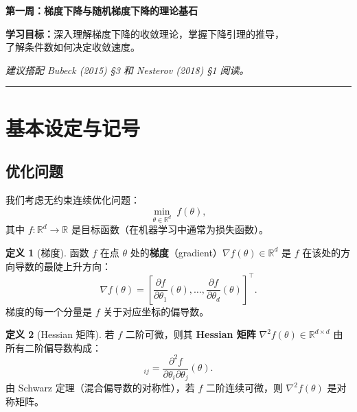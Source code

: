 \documentclass[12pt,a4paper]{ctexart}
\theoremstyle{definition}
\newtheorem{definition}{定义}[section]
\theoremstyle{plain}
\newcommand{\R}{\mathbb{R}}
\newcommand{\grad}{\nabla}
\begin{document}
\begin{center}
\Large\textbf{第一周：梯度下降与随机梯度下降的理论基石}

\vspace{1cm}
\normalsize
\textbf{学习目标：}深入理解梯度下降的收敛理论，掌握下降引理的推导，\\
了解条件数如何决定收敛速度。

\vspace{0.3cm}
\textit{建议搭配 Bubeck (2015) \S 3 和 Nesterov (2018) \S 1 阅读。}
\end{center}

\vspace{0.5cm}
\rule{\textwidth}{0.5pt}

\section{基本设定与记号}

\subsection{优化问题}

我们考虑无约束连续优化问题：
\begin{equation}\label{eq:problem}
  \min_{\theta \in \R^d} \; f(\theta),
\end{equation}
其中 $f:\R^d \to \R$ 是目标函数（在机器学习中通常为损失函数）。

\begin{definition}[梯度]
  函数 $f$ 在点 $\theta$ 处的\textbf{梯度}（gradient）$\grad f(\theta) \in \R^d$ 是 $f$ 在该处的方向导数的最陡上升方向：
  \begin{equation}
    \grad f(\theta) = \left[\frac{\partial f}{\partial \theta_1}(\theta), \ldots, \frac{\partial f}{\partial \theta_d}(\theta)\right]^\top.
  \end{equation}
  梯度的每一个分量是 $f$ 关于对应坐标的偏导数。
\end{definition}

\begin{definition}[Hessian 矩阵]
  若 $f$ 二阶可微，则其 \textbf{Hessian 矩阵} $\grad^2 f(\theta) \in \R^{d \times d}$ 由所有二阶偏导数构成：
  \begin{equation}
    [\grad^2 f(\theta)]_{ij} = \frac{\partial^2 f}{\partial \theta_i \partial \theta_j}(\theta).
  \end{equation}
  由 Schwarz 定理（混合偏导数的对称性），若 $f$ 二阶连续可微，则 $\grad^2 f(\theta)$ 是对称矩阵。
\end{definition}
\end{document}
